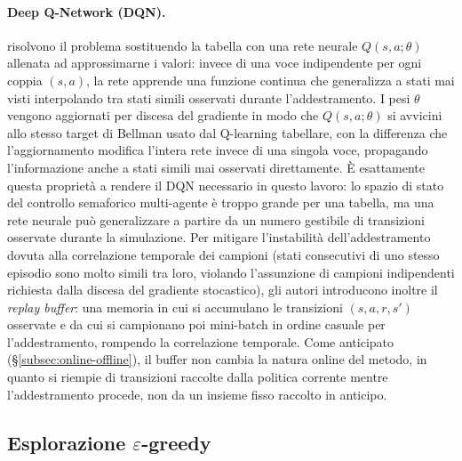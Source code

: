 \paragraph{Deep Q-Network (DQN).} \citet{mnih2015dqn} risolvono il
problema sostituendo la tabella con una rete neurale $Q(s,a;\theta)$
allenata ad approssimarne i valori: invece di una voce indipendente per
ogni coppia $(s,a)$, la rete apprende una funzione continua che
generalizza a stati mai visti interpolando tra stati simili osservati
durante l'addestramento. I pesi $\theta$ vengono aggiornati
per discesa del gradiente in modo che $Q(s,a;\theta)$ si avvicini allo
stesso target di Bellman usato dal Q-learning tabellare, con la
differenza che l'aggiornamento modifica l'intera rete invece di una
singola voce, propagando l'informazione anche a stati simili mai
osservati direttamente. È esattamente questa proprietà a rendere il DQN
necessario in questo lavoro: lo spazio di stato del controllo semaforico
multi-agente è troppo grande per una tabella, ma una rete neurale può
generalizzare a partire da un numero gestibile di transizioni osservate
durante la simulazione. Per mitigare l'instabilità
dell'addestramento dovuta alla correlazione temporale dei campioni (stati
consecutivi di uno stesso episodio sono molto simili tra loro, violando
l'assunzione di campioni indipendenti richiesta dalla discesa del
gradiente stocastico), gli autori introducono inoltre il \emph{replay
  buffer}: una memoria in cui si accumulano le transizioni $(s,a,r,s')$
osservate e da cui si campionano poi mini-batch in ordine casuale per
l'addestramento, rompendo la correlazione temporale. Come anticipato
(§\ref{subsec:online-offline}), il buffer non cambia la natura online del
metodo, in quanto si riempie di transizioni raccolte dalla politica corrente mentre
l'addestramento procede, non da un insieme fisso raccolto in anticipo.

\subsection{Esplorazione $\varepsilon$-greedy}

